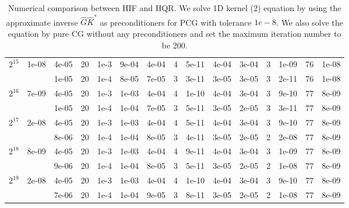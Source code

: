 \documentclass[11pt]{article}
\begin{document}
\begin{table}[!htbp]
\begin{tabular}{|c|c|c|c|c|c|c|c|c|c|c|c|c|c|c|}
\hline
$2^{15}$ & 1e-08 & 4e-05 & 20 & 1e-3 & 9e-04 & 4e-04 & 4 & 5e-11 & 4e-04 & 3e-04 & 3 & 1e-09 & 76 & 1e-08\\
~ & ~ & 1e-05 & 20 & 1e-4 & 8e-05 & 7e-05 & 3 & 3e-11 & 3e-05 & 3e-05 & 3 & 2e-11 & 76 & 1e-08\\
\hline
$2^{16}$ & 7e-09 & 4e-05 & 20 & 1e-3 & 1e-03 & 4e-04 & 4 & 1e-10 & 4e-04 & 3e-04 & 3 & 9e-10 & 77 & 8e-09\\
~ & ~ & 1e-05 & 20 & 1e-4 & 1e-04 & 7e-05 & 3 & 5e-11 & 3e-05 & 2e-05 & 3 & 3e-11 & 77 & 8e-09\\
\hline
$2^{17}$ & 2e-08 & 4e-05 & 20 & 1e-3 & 1e-03 & 4e-04 & 4 & 5e-11 & 4e-04 & 3e-04 & 3 & 9e-10 & 77 & 8e-09\\
~ & ~ & 8e-06 & 20 & 1e-4 & 1e-04 & 8e-05 & 3 & 4e-11 & 3e-05 & 2e-05 & 2 & 2e-08 & 77 & 8e-09\\
\hline
$2^{18}$ & 8e-09 & 4e-05 & 20 & 1e-3 & 1e-03 & 4e-04 & 4 & 9e-11 & 4e-04 & 3e-04 & 3 & 1e-09 & 77 & 8e-09\\
~ & ~ & 9e-06 & 20 & 1e-4 & 1e-04 & 8e-05 & 3 & 5e-11 & 3e-05 & 2e-05 & 2 & 1e-08 & 77 & 8e-09\\
\hline
$2^{19}$ & 2e-08 & 4e-05 & 20 & 1e-3 & 1e-03 & 4e-04 & 4 & 1e-10 & 4e-04 & 3e-04 & 3 & 9e-10 & 77 & 8e-09\\
~ & ~ & 7e-06 & 20 & 1e-4 & 1e-04 & 9e-05 & 3 & 8e-11 & 3e-05 & 2e-05 & 2 & 1e-08 & 77 & 8e-09\\



\end{tabular}

\caption{Numerical comparison between HIF and HQR. We solve 1D kernel (2) equation by using the approximate inverse $\hat{G}\hat{K}^{*}$ as preconditioners for PCG with tolerance $1e-8$. We also solve the equation by pure CG without any preconditioners and set the maximum iteration number to be 200.}
\label{1d-k2}
\end{table}
\end{document}
